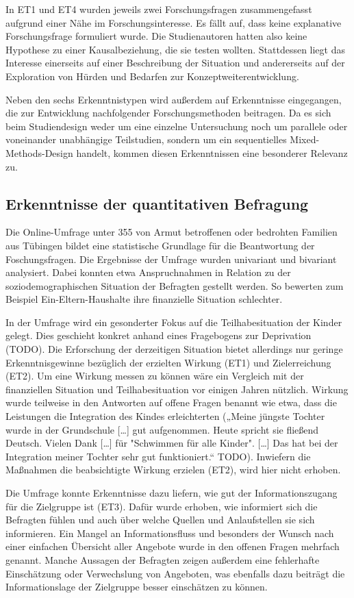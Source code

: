 In ET1 und ET4 wurden jeweils zwei Forschungsfragen zusammengefasst aufgrund einer Nähe im Forschungsinteresse. Es fällt auf, dass keine explanative Forschungsfrage formuliert wurde. Die Studienautoren hatten also keine Hypothese zu einer Kausalbeziehung, die sie testen wollten. Stattdessen liegt das Interesse einerseits auf einer Beschreibung der Situation und andererseits auf der Exploration von Hürden und Bedarfen zur Konzeptweiterentwicklung.

Neben den sechs Erkenntnistypen wird außerdem auf Erkenntnisse eingegangen, die zur Entwicklung nachfolgender Forschungsmethoden beitragen. Da es sich beim Studiendesign weder um eine einzelne Untersuchung noch um parallele oder voneinander unabhängige Teilstudien, sondern um ein sequentielles Mixed-Methods-Design handelt, kommen diesen Erkenntnissen eine besonderer Relevanz zu.

\subsection{Erkenntnisse der quantitativen Befragung}

Die Online-Umfrage unter 355 von Armut betroffenen oder bedrohten Familien aus Tübingen bildet eine statistische Grundlage für die Beantwortung der Foschungsfragen. Die Ergebnisse der Umfrage wurden univariant und bivariant analysiert. Dabei konnten etwa Anspruchnahmen in Relation zu der soziodemographischen Situation der Befragten gestellt werden. So bewerten zum Beispiel Ein-Eltern-Haushalte ihre finanzielle Situation schlechter.

In der Umfrage wird ein gesonderter Fokus auf die Teilhabesituation der Kinder gelegt. Dies geschieht konkret anhand eines Fragebogens zur Deprivation (TODO). Die Erforschung der derzeitigen Situation bietet allerdings nur geringe Erkenntnisgewinne bezüglich der erzielten Wirkung (ET1) und Zielerreichung (ET2). Um eine Wirkung messen zu können wäre ein Vergleich mit der finanziellen Situation und Teilhabesituation vor einigen Jahren nützlich. Wirkung wurde teilweise in den Antworten auf offene Fragen benannt wie etwa, dass die Leistungen die Integration des Kindes erleichterten („Meine jüngste Tochter wurde in der Grundschule […] gut aufgenommen. Heute spricht sie fließend Deutsch. Vielen Dank […] für "Schwimmen für alle Kinder". […] Das hat bei der Integration meiner Tochter sehr gut funktioniert.“ TODO). Inwiefern die Maßnahmen die beabsichtigte Wirkung erzielen (ET2), wird hier nicht erhoben.

Die Umfrage konnte Erkenntnisse dazu liefern, wie gut der Informationszugang für die Zielgruppe ist (ET3). Dafür wurde erhoben, wie informiert sich die Befragten fühlen und auch über welche Quellen und Anlaufstellen sie sich informieren. Ein Mangel an Informationsfluss und besonders der Wunsch nach einer einfachen Übersicht aller Angebote wurde in den offenen Fragen mehrfach genannt. Manche Aussagen der Befragten zeigen außerdem eine fehlerhafte Einschätzung oder Verwechslung von Angeboten, was ebenfalls dazu beiträgt die Informationslage der Zielgruppe besser einschätzen zu können.

